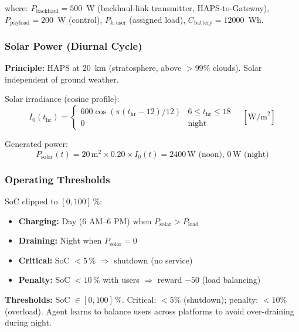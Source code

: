 \documentclass[conference]{IEEEtran}
\begin{document}
where: $P_{\text{backhaul}} = 500$~W (backhaul-link transmitter, HAPS-to-Gateway), $P_{\text{payload}} = 200$~W (control), $P_{k,\text{user}}$ (assigned load), $C_{\text{battery}} = 12000$~Wh.

\subsubsection{Solar Power (Diurnal Cycle)}

\textbf{Principle:} HAPS at 20~km (stratosphere, above $>99\%$ clouds). Solar independent of ground weather.

\noindent Solar irradiance (cosine profile):
\begin{equation}
I_0(t_{\text{hr}}) = \begin{cases}
600 \cos(\pi(t_{\text{hr}} - 12)/12) & 6 \le t_{\text{hr}} \le 18 \\
0 & \text{night}
\end{cases} \quad [\text{W/m}^2]
\end{equation}

\noindent Generated power:
\begin{equation}
P_{\text{solar}}(t) = 20\,\text{m}^2 \times 0.20 \times I_0(t) = 2400\,\text{W (noon)}, \, 0\,\text{W (night)}
\end{equation}

\subsubsection{Operating Thresholds}

SoC clipped to $[0, 100]\,\%$:
\begin{itemize}\setlength{\itemsep}{2pt}
  \item \textbf{Charging:} Day (6 AM--6 PM) when $P_{\text{solar}} > P_{\text{load}}$
  \item \textbf{Draining:} Night when $P_{\text{solar}} = 0$
  \item \textbf{Critical:} SoC $< 5\,\%$ $\Rightarrow$ shutdown (no service)
  \item \textbf{Penalty:} SoC $< 10\,\%$ with users $\Rightarrow$ reward $-50$ (load balancing)
\end{itemize}

\textbf{Thresholds:} SoC $\in [0,100]\,\%$. Critical: $< 5\%$ (shutdown); penalty: $< 10\%$ (overload). Agent learns to balance users across platforms to avoid over-draining during night.

\FloatBarrier
\end{document}
